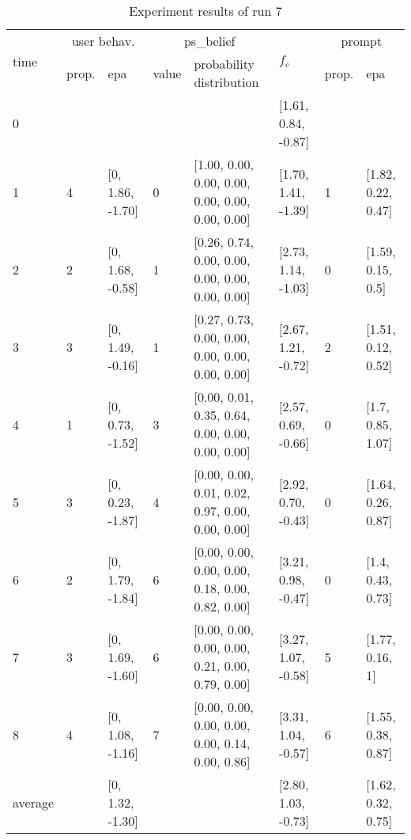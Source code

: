 \begin{table}[htbp]\footnotesize
\caption{Experiment results of run 7}
\begin{tabular}{|p{0.4cm}|p{0.6cm}|l|p{0.6cm}|p{3.3cm}|l|p{0.6cm}|l|}
\hline

\multirow{2}{*}{time} & \multicolumn{2}{c|}{user behav.} & \multicolumn{2}{c|}{ps\_belief} &
\multirow{2}{*}{$f_c$} & \multicolumn{2}{c|}{prompt} \\ \cline{2-5}\cline{ 7- 8}
& prop. & epa & value & probability distribution &  & prop. & epa \\ \hline

0 & \multicolumn{1}{l|}{} &  & \multicolumn{1}{l|}{} &  & [1.61, 0.84, -0.87] & \multicolumn{1}{l|}{} &  \\ \hline
1 & 4 & [0, 1.86, -1.70] & 0 & [1.00, 0.00, 0.00, 0.00, 0.00, 0.00, 0.00, 0.00] & [1.70, 1.41, -1.39] & 1 & [1.82, 0.22, 0.47] \\ \hline
2 & 2 & [0, 1.68, -0.58] & 1 & [0.26, 0.74, 0.00, 0.00, 0.00, 0.00, 0.00, 0.00] & [2.73, 1.14, -1.03] & 0 & [1.59, 0.15, 0.5] \\ \hline
3 & 3 & [0, 1.49, -0.16] & 1 & [0.27, 0.73, 0.00, 0.00, 0.00, 0.00, 0.00, 0.00] & [2.67, 1.21, -0.72] & 2 & [1.51, 0.12, 0.52] \\ \hline
4 & 1 & [0, 0.73, -1.52] & 3 & [0.00, 0.01, 0.35, 0.64, 0.00, 0.00, 0.00, 0.00] & [2.57, 0.69, -0.66] & 0 & [1.7, 0.85, 1.07] \\ \hline
5 & 3 & [0, 0.23, -1.87] & 4 & [0.00, 0.00, 0.01, 0.02, 0.97, 0.00, 0.00, 0.00] & [2.92, 0.70, -0.43] & 0 & [1.64, 0.26, 0.87] \\ \hline
6 & 2 & [0, 1.79, -1.84] & 6 & [0.00, 0.00, 0.00, 0.00, 0.18, 0.00, 0.82, 0.00] & [3.21, 0.98, -0.47] & 0 & [1.4, 0.43, 0.73] \\ \hline
7 & 3 & [0, 1.69, -1.60] & 6 & [0.00, 0.00, 0.00, 0.00, 0.21, 0.00, 0.79, 0.00] & [3.27, 1.07, -0.58] & 5 & [1.77, 0.16, 1] \\ \hline
8 & 4 & [0, 1.08, -1.16] & 7 & [0.00, 0.00, 0.00, 0.00, 0.00, 0.14, 0.00, 0.86] & [3.31, 1.04, -0.57] & 6 & [1.55, 0.38, 0.87] \\ \hline
\multicolumn{1}{|l|}{average} & \multicolumn{1}{l|}{} & [0, 1.32, -1.30] & \multicolumn{1}{l|}{} &  & [2.80, 1.03, -0.73] & \multicolumn{1}{l|}{} & [1.62, 0.32, 0.75] \\ \hline
\end{tabular}
\label{}
\end{table}



